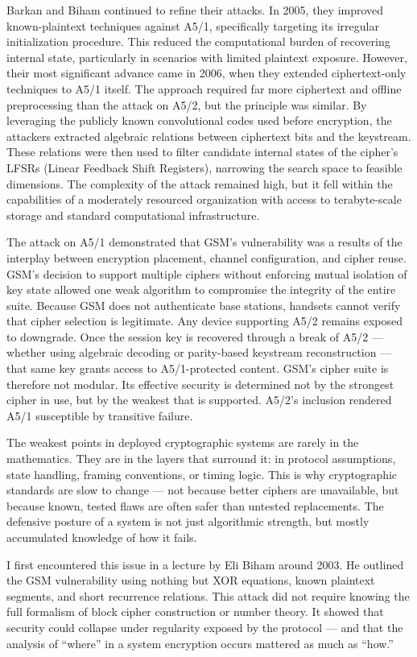 Barkan and Biham continued to refine their attacks. In 2005, they improved known-plaintext techniques against A5/1, specifically targeting its irregular initialization procedure. This reduced the computational burden of recovering internal state, particularly in scenarios with limited plaintext exposure. However, their most significant advance came in 2006, when they extended ciphertext-only techniques to A5/1 itself. The approach required far more ciphertext and offline preprocessing than the attack on A5/2, but the principle was similar. By leveraging the publicly known convolutional codes used before encryption, the attackers extracted algebraic relations between ciphertext bits and the keystream. These relations were then used to filter candidate internal states of the cipher’s LFSRs (Linear Feedback Shift Registers), narrowing the search space to feasible dimensions. The complexity of the attack remained high, but it fell within the capabilities of a moderately resourced organization with access to terabyte-scale storage and standard computational infrastructure.

The attack on A5/1 demonstrated that GSM’s vulnerability was a results of the interplay between encryption placement, channel configuration, and cipher reuse. GSM’s decision to support multiple ciphers without enforcing mutual isolation of key state allowed one weak algorithm to compromise the integrity of the entire suite. Because GSM does not authenticate base stations, handsets cannot verify that cipher selection is legitimate. Any device supporting A5/2 remains exposed to downgrade. Once the session key is recovered through a break of A5/2 — whether using algebraic decoding or parity-based keystream reconstruction — that same key grants access to A5/1-protected content. GSM’s cipher suite is therefore not modular. Its effective security is determined not by the strongest cipher in use, but by the weakest that is supported. A5/2’s inclusion rendered A5/1 susceptible by transitive failure.
\newpage
\begin{commentary}

The weakest points in deployed cryptographic systems are rarely in the mathematics. They are in the layers that surround it: in protocol assumptions, state handling, framing conventions, or timing logic. This is why cryptographic standards are slow to change — not because better ciphers are unavailable, but because known, tested flaws are often safer than untested replacements. The defensive posture of a system is not just algorithmic strength, but mostly accumulated knowledge of how it fails.

I first encountered this issue in a lecture by Eli Biham around 2003. He outlined the GSM vulnerability using nothing but XOR equations, known plaintext segments, and short recurrence relations. This attack did not require knowing the full formalism of block cipher construction or number theory. It showed that security could collapse under regularity exposed by the protocol — and that the analysis of “where” in a system encryption occurs mattered as much as “how.”

\end{commentary}
